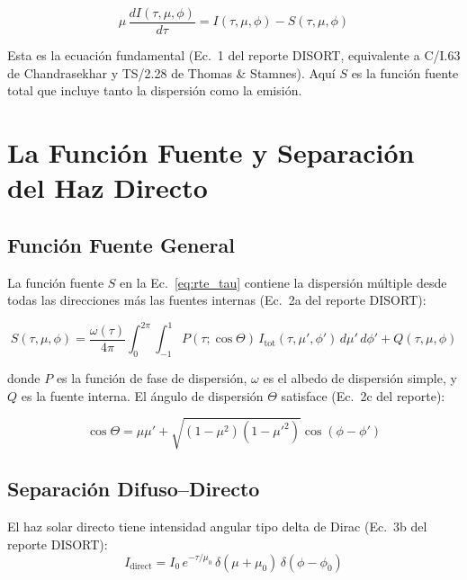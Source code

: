 \documentclass[a4paper,11pt]{article}
\begin{document}
\begin{equation}\label{eq:rte_tau}
    \boxed{\mu\,\frac{dI(\tau,\mu,\phi)}{d\tau} = I(\tau,\mu,\phi) - S(\tau,\mu,\phi)}
\end{equation}

Esta es la ecuaci\'on fundamental (Ec.~1 del reporte DISORT, equivalente a C/I.63
de Chandrasekhar y TS/2.28 de Thomas \& Stamnes).  Aqu\'i $S$ es la funci\'on
fuente total que incluye tanto la dispersi\'on como la emisi\'on.


\section{La Funci\'on Fuente y Separaci\'on del Haz Directo}

\subsection{Funci\'on Fuente General}

La funci\'on fuente $S$ en la Ec.~\eqref{eq:rte_tau} contiene la dispersi\'on
m\'ultiple desde todas las direcciones m\'as las fuentes internas (Ec.~2a del
reporte DISORT):

\begin{equation}\label{eq:source_general}
    S(\tau,\mu,\phi) = \frac{\omega(\tau)}{4\pi}\int_0^{2\pi}\int_{-1}^{1}
    P(\tau;\cos\Theta)\,I_{\text{tot}}(\tau,\mu',\phi')\,d\mu'\,d\phi'
    + Q(\tau,\mu,\phi)
\end{equation}

donde $P$ es la funci\'on de fase de dispersi\'on, $\omega$ es el albedo de
dispersi\'on simple, y $Q$ es la fuente interna.  El \'angulo de dispersi\'on
$\Theta$ satisface (Ec.~2c del reporte):

\begin{equation}\label{eq:cos_theta}
    \cos\Theta = \mu\mu' + \sqrt{(1-\mu^2)(1-\mu'^2)}\cos(\phi - \phi')
\end{equation}

\subsection{Separaci\'on Difuso--Directo}

El haz solar directo tiene intensidad angular tipo delta de Dirac (Ec.~3b del
reporte DISORT):
\begin{equation}
    I_{\text{direct}} = I_0\,e^{-\tau/\mu_0}\,\delta(\mu+\mu_0)\,\delta(\phi-\phi_0)
\end{equation}
\end{document}
